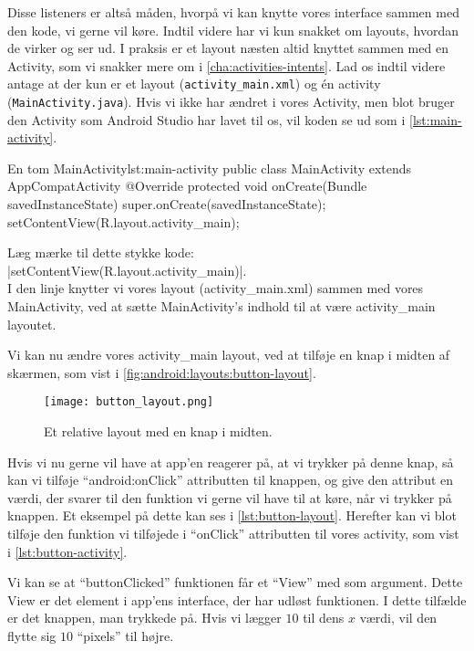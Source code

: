 Disse listeners er altså måden, hvorpå vi kan knytte vores \gls{interface} 
sammen med den kode, vi gerne vil køre. Indtil videre har vi kun snakket om 
layouts, hvordan de virker og ser ud. I praksis er et layout næsten altid 
knyttet sammen med en Activity, som vi snakker mere om i 
\autoref{cha:activities-intents}. Lad os indtil videre antage at der kun er et 
layout (\texttt{activity\_main.xml}) og én activity (\texttt{MainActivity.java}). Hvis vi ikke har ændret i vores Activity, men blot bruger den Activity som Android Studio har lavet til os, vil koden se ud som i \autoref{lst:main-activity}.

\begin{JavaCode}{En tom MainActivity}{lst:main-activity}
	public class MainActivity extends AppCompatActivity {
		@Override
		protected void onCreate(Bundle savedInstanceState) {
			super.onCreate(savedInstanceState);
			setContentView(R.layout.activity_main);
		}
	}
\end{JavaCode}

\noindent
Læg mærke til dette stykke kode: \\
\JavaInline|setContentView(R.layout.activity_main)|. \\
I den linje knytter vi vores layout (activity\_main.xml) sammen med vores MainActivity, ved at sætte MainActivity's indhold til at være activity\_main layoutet.

Vi kan nu ændre vores activity\_main layout, ved at tilføje en knap i midten af skærmen, som vist i \autoref{fig:android:layouts:button-layout}.

\begin{figure}[h]
	\begin{center}
		\texttt{[image: button\_layout.png]}
		\caption{Et relative layout med en knap i midten.}
		\label{fig:android:layouts:button-layout}
	\end{center}
\end{figure}

Hvis vi nu gerne vil have at app'en reagerer på, at vi trykker på denne knap, så 
kan vi tilføje ``android:onClick'' attributten til knappen, og give den attribut 
en værdi, der svarer til den funktion vi gerne vil have til at køre, når vi 
trykker på knappen. Et eksempel på dette kan ses i \autoref{lst:button-layout}.
Herefter kan vi blot tilføje den funktion vi tilføjede i ``onClick'' 
attributten til vores activity, som vist i \autoref{lst:button-activity}.

Vi kan se at ``buttonClicked'' funktionen får et ``View'' med som argument. 
Dette View er det element i app'ens \gls{interface}, der har udløst funktionen. 
I dette tilfælde er det knappen, man trykkede på. Hvis vi lægger $10$ til dens 
$x$ værdi, vil den flytte sig $10$ ``pixels'' til højre.


